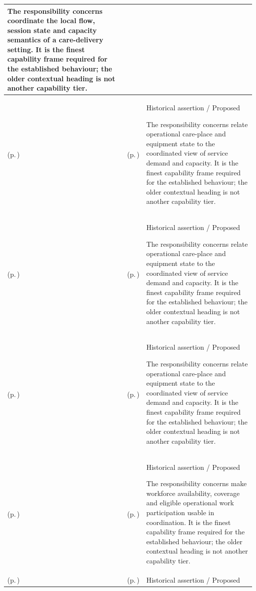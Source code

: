 \begin{longtable}{|>{\raggedright\arraybackslash}p{0.27\TableWidth}|>{\raggedright\arraybackslash}p{0.27\TableWidth}|>{\raggedright\arraybackslash}p{0.46\TableWidth}|}
The responsibility concerns coordinate the local flow, session state and capacity semantics of a care-delivery setting. It is the finest capability frame required for the established behaviour; the older contextual heading is not another capability tier.\\\hline
\nameref{cap:bec-care-resource-capacity-coordination} (p.\,\pageref{cap:bec-care-resource-capacity-coordination}) & \nameref{cap:bec-bed-care-place-management} (p.\,\pageref{cap:bec-bed-care-place-management}) & Historical assertion / Proposed

The responsibility concerns relate operational care-place and equipment state to the coordinated view of service demand and capacity. It is the finest capability frame required for the established behaviour; the older contextual heading is not another capability tier.\\\hline
\nameref{cap:bec-care-resource-capacity-coordination} (p.\,\pageref{cap:bec-care-resource-capacity-coordination}) & \nameref{cap:bec-clinical-resource-management} (p.\,\pageref{cap:bec-clinical-resource-management}) & Historical assertion / Proposed

The responsibility concerns relate operational care-place and equipment state to the coordinated view of service demand and capacity. It is the finest capability frame required for the established behaviour; the older contextual heading is not another capability tier.\\\hline
\nameref{cap:bec-care-resource-capacity-coordination} (p.\,\pageref{cap:bec-care-resource-capacity-coordination}) & \nameref{cap:bec-service-capacity-management} (p.\,\pageref{cap:bec-service-capacity-management}) & Historical assertion / Proposed

The responsibility concerns relate operational care-place and equipment state to the coordinated view of service demand and capacity. It is the finest capability frame required for the established behaviour; the older contextual heading is not another capability tier.\\\hline
\nameref{cap:bec-operational-workforce-coordination} (p.\,\pageref{cap:bec-operational-workforce-coordination}) & \nameref{cap:bec-clinical-workforce-management} (p.\,\pageref{cap:bec-clinical-workforce-management}) & Historical assertion / Proposed

The responsibility concerns make workforce availability, coverage and eligible operational work participation usable in coordination. It is the finest capability frame required for the established behaviour; the older contextual heading is not another capability tier.\\\hline
\nameref{cap:bec-operational-workforce-coordination} (p.\,\pageref{cap:bec-operational-workforce-coordination}) & \nameref{cap:bec-clinical-rostering} (p.\,\pageref{cap:bec-clinical-rostering}) & Historical assertion / Proposed


\end{longtable}
